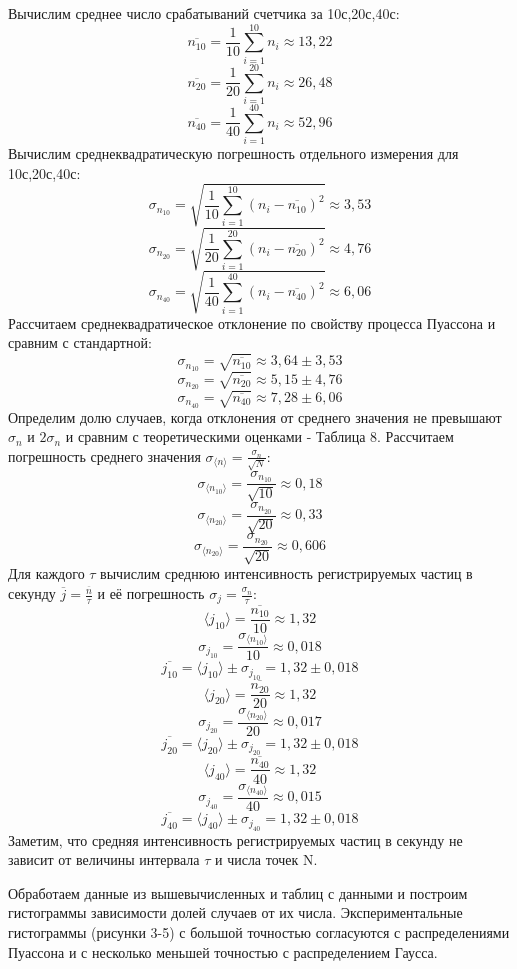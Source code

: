 \documentclass[a4paper]{article}
\begin{document}
Вычислим среднее число срабатываний счетчика за 10с,20с,40с:
\[\overline{n_{10}} = \frac{1}{10}\sum\limits_{i=1}^{10} n_{i} \approx 13,22\]
\[\overline{n_{20}} = \frac{1}{20}\sum\limits_{i=1}^{20} n_{i} \approx 26,48\]
\[\overline{n_{40}} = \frac{1}{40}\sum\limits_{i=1}^{40} n_{i} \approx 52,96\]
Вычислим среднеквадратическую погрешность отдельного измерения для 10с,20с,40с:
\[\sigma_{n_{10}} = \sqrt{\frac{1}{10}\sum\limits_{i=1}^{10} (n_{i} - \overline{n_{10}})^2} \approx 3,53\]
\[\sigma_{n_{20}} = \sqrt{\frac{1}{20}\sum\limits_{i=1}^{20} (n_{i} - \overline{n_{20}})^2} \approx 4,76\]
\[\sigma_{n_{40}} = \sqrt{\frac{1}{40}\sum\limits_{i=1}^{40} (n_{i} - \overline{n_{40}})^2} \approx 6,06\]
Рассчитаем среднеквадратическое отклонение по свойству процесса Пуассона и сравним с стандартной:
\[\sigma_{n_{10}} = \sqrt{\overline{n_{10}}} \approx 3,64 \pm 3,53\]
\[\sigma_{n_{20}} = \sqrt{\overline{n_{20}}} \approx 5,15 \pm 4,76\]
\[\sigma_{n_{40}} = \sqrt{\overline{n_{40}}} \approx 7,28 \pm 6,06\]
Определим долю случаев, когда отклонения от среднего значения не превышают $\sigma_{n}$ и $2\sigma_{n}$ и сравним с теоретическими оценками - Таблица 8.
Рассчитаем погрешность среднего значения $\sigma_{\langle n \rangle} = \frac{\sigma_{n}}{\sqrt{N}}$:
\[\sigma_{\langle n_{10} \rangle} = \frac{\sigma_{n_{10}}}{\sqrt{10}} \approx 0,18\]
\[\sigma_{\langle n_{20} \rangle} = \frac{\sigma_{n_{20}}}{\sqrt{20}} \approx 0,33\]
\[\sigma_{\langle n_{20} \rangle} = \frac{\sigma_{n_{20}}}{\sqrt{20}} \approx 0,606\]
Для каждого $\tau$ вычислим среднюю интенсивность регистрируемых частиц в секунду $\overline{j} = \frac{\overline{n}}{\tau}$ и её погрешность 
$\sigma_{j} = \frac{\sigma_{n}}{\tau}$:
\[\langle j_{10} \rangle = \frac{\overline{n_{10}}}{10} \approx 1,32\]
\[\sigma_{j_{10}} = \frac{\sigma_{\langle n_{10} \rangle}}{10} \approx 0,018\]
\[\overline{j_{10}} = \langle j_{10} \rangle \pm \sigma_{j_{10}} = 1,32 \pm 0,018 \]
\[\langle j_{20} \rangle = \frac{\overline{n_{20}}}{20} \approx 1,32\]
\[\sigma_{j_{20}} = \frac{\sigma_{\langle n_{20} \rangle}}{20} \approx 0,017\]
\[\overline{j_{20}} = \langle j_{20} \rangle \pm \sigma_{j_{20}} = 1,32 \pm 0,018 \]
\[\langle j_{40} \rangle = \frac{\overline{n_{40}}}{40} \approx 1,32\]
\[\sigma_{j_{40}} = \frac{\sigma_{\langle n_{40} \rangle}}{40} \approx 0,015\]
\[\overline{j_{40}} = \langle j_{40} \rangle \pm \sigma_{j_{40}} = 1,32 \pm 0,018 \]
Заметим, что средняя интенсивность регистрируемых частиц в секунду не зависит от величины интервала $\tau$ и числа точек N.

Обработаем данные из вышевычисленных и таблиц с данными и построим гистограммы зависимости долей случаев от их числа. Экспериментальные гистограммы (рисунки 3-5) с большой точностью согласуются с распределениями Пуассона и с несколько меньшей точностью с распределением Гаусса. 
\end{document}
